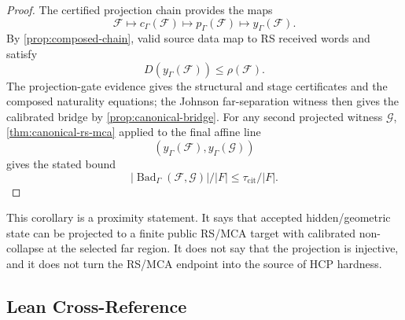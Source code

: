 \begin{proof}
The certified projection chain provides the maps
\[
  \mathcal F\longmapsto
  c_\Gamma(\mathcal F)\longmapsto
  p_\Gamma(\mathcal F)\longmapsto
  y_\Gamma(\mathcal F).
\]
By \cref{prop:composed-chain}, valid source data map to RS received words and
satisfy
\[
  D(y_\Gamma(\mathcal F))\le\rho(\mathcal F).
\]
The projection-gate evidence gives the structural and stage certificates and
the composed naturality equations; the Johnson far-separation witness then
gives the calibrated bridge by \cref{prop:canonical-bridge}. For any second
projected witness
\(\mathcal G\), \cref{thm:canonical-rs-mca} applied to the final affine line
\[
  (y_\Gamma(\mathcal F),y_\Gamma(\mathcal G))
\]
gives the stated bound
\[
  |\operatorname{Bad}_{\Gamma}(\mathcal F,\mathcal G)|/|F|
  \le \tau_{\mathrm{cit}}/|F|.
\]
\end{proof}

This corollary is a proximity statement. It says that accepted hidden/geometric
state can be projected to a finite public RS/MCA target with calibrated
non-collapse at the selected far region. It does not say that the projection is
injective, and it does not turn the RS/MCA endpoint into the source of HCP
hardness.

\subsection*{Lean Cross-Reference}

